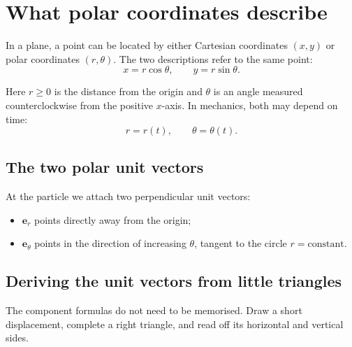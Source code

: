 \documentclass[11pt,a4paper]{article}
\newcommand{\er}{\bm e_r}
\newcommand{\etheta}{\bm e_\theta}
\begin{document}
\tableofcontents
\thispagestyle{fancy}
\clearpage

\section{What polar coordinates describe}

In a plane, a point can be located by either Cartesian coordinates $(x,y)$ or polar coordinates $(r,\theta)$. The two descriptions refer to the same point:
\[
  x=r\cos\theta,
  \qquad
  y=r\sin\theta.
\]

Here $r\ge 0$ is the distance from the origin and $\theta$ is an angle measured counterclockwise from the positive $x$-axis. In mechanics, both may depend on time:
\[
  r=r(t),
  \qquad
  \theta=\theta(t).
\]

\subsection{The two polar unit vectors}

At the particle we attach two perpendicular unit vectors:

\begin{itemize}
  \item $\er$ points directly away from the origin;
  \item $\etheta$ points in the direction of increasing $\theta$, tangent to the circle $r=\text{constant}$.
\end{itemize}

\subsection{Deriving the unit vectors from little triangles}

The component formulas do not need to be memorised. Draw a short displacement, complete a right triangle, and read off its horizontal and vertical sides.
\end{document}
